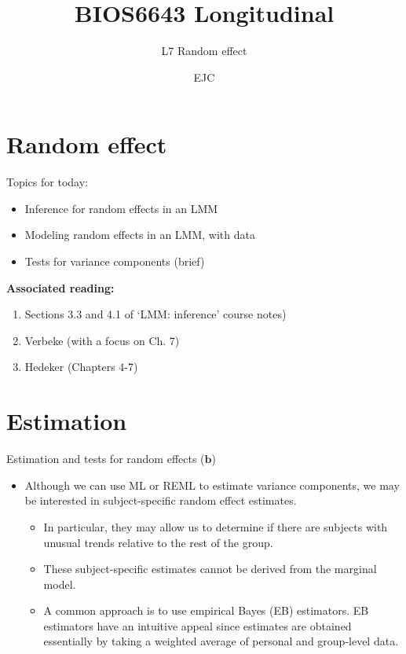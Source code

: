 \documentclass[
  9pt,
  ignorenonframetext,
]{beamer}
\title{BIOS6643 Longitudinal}
\subtitle{L7 Random effect}
\author{EJC}
\date{}
\institute{Department of Biostatistics \& Informatics}
\begin{document}
\frame{\titlepage}

\begin{frame}[allowframebreaks]
  \tableofcontents[hideallsubsections]
\end{frame}
\hypertarget{random-effect}{%
\section{Random effect}\label{random-effect}}

\begin{frame}{Topics for today:}
\protect\hypertarget{topics-for-today}{}
\begin{itemize}
\item
  Inference for random effects in an LMM
\item
  Modeling random effects in an LMM, with data
\item
  Tests for variance components (brief)
\end{itemize}

\vspace{\baselineskip}

\textbf{Associated reading:}

\begin{enumerate}
\item
  Sections 3.3 and 4.1 of `LMM: inference' course notes)
\item
  Verbeke (with a focus on Ch. 7)
\item
  Hedeker (Chapters 4-7)
\end{enumerate}
\end{frame}

\hypertarget{estimation}{%
\section{Estimation}\label{estimation}}

\begin{frame}{Estimation and tests for random effects (\(\pmb b\))}
\protect\hypertarget{estimation-and-tests-for-random-effects-pmb-b}{}
\begin{itemize}
\item
  Although we can use ML or REML to estimate variance components, we may
  be interested in subject-specific random effect estimates.

  \begin{itemize}
  \item
    In particular, they may allow us to determine if there are subjects
    with unusual trends relative to the rest of the group.
  \item
    These subject-specific estimates cannot be derived from the marginal
    model.
  \item
    A common approach is to use empirical Bayes (EB) estimators. EB
    estimators have an intuitive appeal since estimates are obtained
    essentially by taking a weighted average of personal and group-level
    data.
  \end{itemize}
\end{itemize}
\end{frame}
\end{document}
